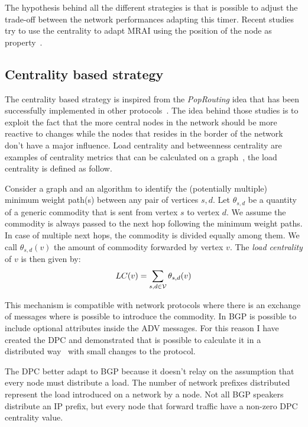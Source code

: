 The hypothesis behind all the different strategies is that is possible to
adjust the trade-off between the network performances adapting this timer.
Recent studies try to use the centrality to adapt \ac{MRAI} using the position
of the node as property~\cite{milani2020improving}.

\subsection{Centrality based strategy}
\label{subsec:bgp_mrai_dpc}

The centrality based strategy is inspired from the \textit{PopRouting} idea
that has been successfully implemented in other protocols~\cite{MaLo18_ToN,GhiMa18_infocom}.
The idea behind those studies is to exploit the fact that the more central nodes
in the network should be more reactive to changes while the nodes that resides
in the border of the network don't have a major influence.
Load centrality and betweenness centrality are examples of centrality metrics
that can be calculated on a graph~\cite{Brandes2008variants}, the load centrality
is defined as follow.

\begin{definition}
		Consider a graph \graph and an algorithm to identify the (potentially multiple)
		minimum weight path(s) between any pair of vertices $s,d$.
		Let $\theta_{s,d}$ be a quantity of a generic commodity that is sent from vertex
		$s$ to vertex $d$.
		We assume the commodity is always passed to the next hop following the minimum weight paths.
		In case of multiple next hops, the commodity is divided equally among them.
		We call $\theta_{s,d}(v)$ the amount of  commodity forwarded by vertex $v$.
		The \emph{load centrality} of $v$ is then given by:
		\begin{equation}
				LC(v) = \sum_{s,d \in \mathcal{V}}\theta_{s,d}(v)
				\label{eq:lc}
		\end{equation}
\end{definition}

This mechanism is compatible with network protocols where there is an exchange
of messages where is possible to introduce the commodity.
In \ac{BGP} is possible to include optional attributes inside the \ac{ADV} messages.
For this reason I have created the \ac{DPC} and demonstrated that is possible
to calculate it in a distributed way~\cite{milani2019BGP} with small changes
to the protocol.

The \ac{DPC} better adapt to \ac{BGP} because it doesn't relay on the assumption
that every node must distribute a load.
The number of network prefixes distributed represent the load introduced on a
network by a node.
Not all \ac{BGP} speakers distribute an \ac{IP} prefix, but every node that forward
traffic have a non-zero \ac{DPC} centrality value.

